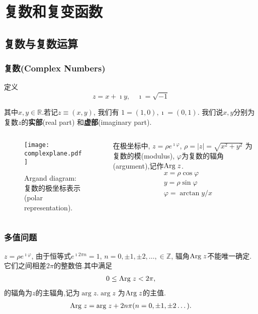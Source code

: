 \section{复数和复变函数}

\subsection{复数与复数运算}

\begin{frame}
\frametitle{复数(Complex Numbers)}

\begin{block}{定义}
    \begin{equation*}
        z = x + \imath y, \quad \imath = \sqrt{-1}
    \end{equation*} 
\end{block}
其中$x,y \in {\mathbb{R}}$.若记$z \equiv (x,y)$, 我们有
$1 = (1,0), \imath = (0, 1)$.
我们说$x,y$分别为复数$z$的{\bf 实部}(real part) 和{\bf 虚部}(imaginary part).
\begin{columns}
\begin{column}{0.6\textwidth}
    \begin{figure}
        \texttt{[image: complexplane.pdf]}
        \caption{Argand diagram:复数的极坐标表示(polar representation).}
    \end{figure}
\end{column}
\begin{column}{0.4\textwidth}   
     在极坐标中, $z=\rho e^{\imath \varphi}$, $\rho = |z|=\sqrt{x^2 + y^2}$ 为复数的模(modulus), $\varphi$为复数的辐角(argument),记作${\mathrm{Arg}\;} z$.
    \begin{align*}
        & x = \rho \cos\varphi \\
        & y = \rho \sin\varphi \\
        & \varphi = \arctan y/x
    \end{align*}
\end{column}
\end{columns}
\end{frame}


\begin{frame}
    \frametitle{多值问题}
$z=\rho e^{\imath \varphi}$, 由于恒等式$e^{\imath 2\pi n} = 1$, $n = 0, \pm 1, \pm 2, \dots, \in \mathbb{Z}$, 辐角${\mathrm{Arg}\;} z$不能唯一确定.
它们之间相差$2\pi$的整数倍.其中满足
\begin{align*}
    0 \leq {\mathrm{Arg}\;} z < 2\pi,
\end{align*}
的辐角为$z$的主辐角,记为$\arg z$.$\arg z$ 为${\mathrm{Arg}\;} z$的主值.
\begin{align*}
    {\mathrm{Arg}\;} z = {\mathrm{arg}\;} z + 2 n \pi (n = 0, \pm 1, \pm 2\dots).
\end{align*}

\end{frame}


